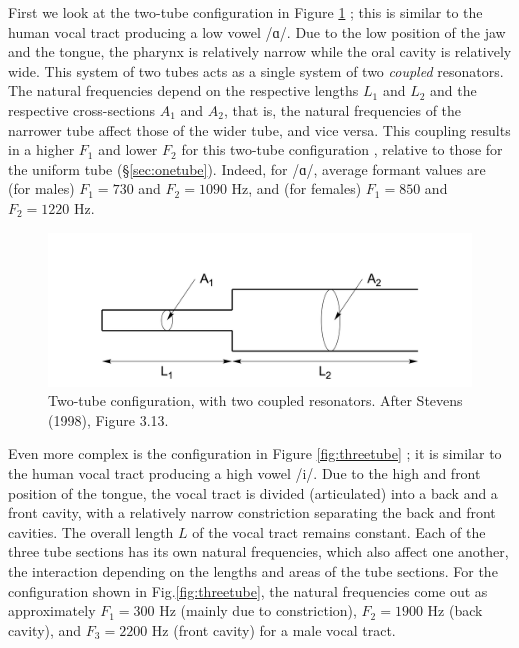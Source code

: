 \documentclass[
]{book}
\begin{document}
First we look at the two-tube configuration in Figure \ref{fig:twotube} \citep[after][Fig.3.13, p.143]{Stevens_1998}; this is similar to the human vocal tract producing a low vowel /ɑ/. Due to the low position of the jaw and the tongue, the pharynx is relatively narrow while the oral cavity is relatively wide. This system of two tubes acts as a single system of two \emph{coupled} resonators. The natural frequencies depend on the respective lengths \(L_1\) and \(L_2\) and the respective cross-sections \(A_1\) and \(A_2\), that is, the natural frequencies of the narrower tube affect those of the wider tube, and vice versa. This coupling results in a higher \(F_1\) and lower \(F_2\) for this two-tube configuration \citep[Fig.3.14]{Stevens_1998}, relative to those for the uniform tube (§\ref{sec:onetube}). Indeed, for /ɑ/, average formant values are (for males) \(F_1=730\) and \(F_2=1090\) Hz, and (for females) \(F_1=850\) and \(F_2=1220\) Hz.

\begin{figure}

{\centering \includegraphics{figures/twotube} 

}

\caption{Two-tube configuration, with two coupled resonators. After Stevens (1998), Figure 3.13.}\label{fig:twotube}
\end{figure}

Even more complex is the configuration in Figure \ref{fig:threetube} \citep[after][Fig.3.15, p.144]{Stevens_1998}; it is similar to the human vocal tract producing a high vowel /i/. Due to the high and front position of the tongue, the vocal tract is divided (articulated) into a back and a front cavity, with a relatively narrow constriction separating the back and front cavities. The overall length \(L\) of the vocal tract remains constant. Each of the three tube sections has its own natural frequencies, which also affect one another, the interaction depending on the lengths and areas of the tube sections. For the configuration shown in Fig.\ref{fig:threetube}, the natural frequencies come out as approximately \(F_1=300\) Hz (mainly due to constriction), \(F_2=1900\) Hz (back cavity), and \(F_3=2200\) Hz (front cavity) \citep[137]{Johnson_2012} for a male vocal tract.
\end{document}
